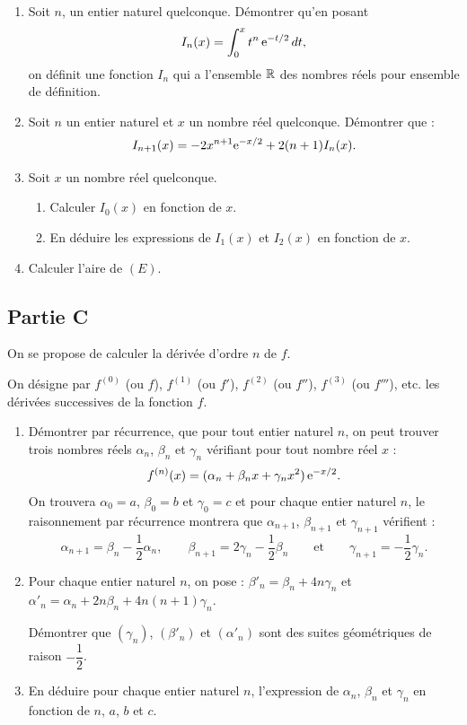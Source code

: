 \begin{enumerate}
	\item Soit $n$, un entier naturel quelconque. Démontrer qu'en posant
	$$
	I_n(x)=\int_0^x t^n\,\mathrm{e}^{-t/2}\,dt,
	$$
	on définit une fonction $I_n$ qui a l'ensemble $\mathbb{R}$ des nombres réels pour ensemble de définition.
	\item Soit $n$ un entier naturel et $x$ un nombre réel quelconque. Démontrer que :
	\[
	I_{n+1}(x) = -2x^{n+1}\mathrm{e}^{-x/2} + 2(n+1)I_n(x).
	\]
	\item Soit $x$ un nombre réel quelconque.
	\begin{enumerate}
		\item Calculer $I_0(x)$ en fonction de $x$.
		\item En déduire les expressions de $I_1(x)$ et $I_2(x)$ en fonction de $x$.
	\end{enumerate}
	\item Calculer l'aire de $(E)$.
\end{enumerate}

\subsection*{Partie C}

On se propose de calculer la dérivée d'ordre $n$ de $f$.

On désigne par $f^{(0)}$ (ou $f$), $f^{(1)}$ (ou $f'$), $f^{(2)}$ (ou $f''$), $f^{(3)}$ (ou $f'''$), etc. les dérivées successives de la fonction $f$.

\begin{enumerate}
	\item Démontrer par récurrence, que pour tout entier naturel $n$, on peut trouver trois nombres réels $\alpha_n$, $\beta_n$ et $\gamma_n$ vérifiant pour tout nombre réel $x$ :
	\[
	f^{(n)}(x) = (\alpha_n+\beta_nx+\gamma_nx^2)\,\mathrm{e}^{-x/2}.
	\]
	On trouvera $\alpha_0=a$, $\beta_0=b$ et $\gamma_0=c$ et pour chaque entier naturel $n$, le raisonnement par récurrence montrera que $\alpha_{n+1}$, $\beta_{n+1}$ et $\gamma_{n+1}$ vérifient :
	\[
	\alpha_{n+1}=\beta_n-\frac12\alpha_n, \qquad \beta_{n+1}=2\gamma_n-\frac12\beta_n \qquad \text{et} \qquad \gamma_{n+1}=-\frac12\gamma_n.
	\]
	\item Pour chaque entier naturel $n$, on pose : $\beta'_n=\beta_n+4n\gamma_n$ et $\alpha'_n=\alpha_n+2n\beta_n+4n(n+1)\gamma_n$.

	Démontrer que $(\gamma_n)$, $(\beta'_n)$ et $(\alpha'_n)$ sont des suites géométriques de raison $-\dfrac12$.
	\item En déduire pour chaque entier naturel $n$, l'expression de $\alpha_n$, $\beta_n$ et $\gamma_n$ en fonction de $n$, $a$, $b$ et $c$.
\end{enumerate}


